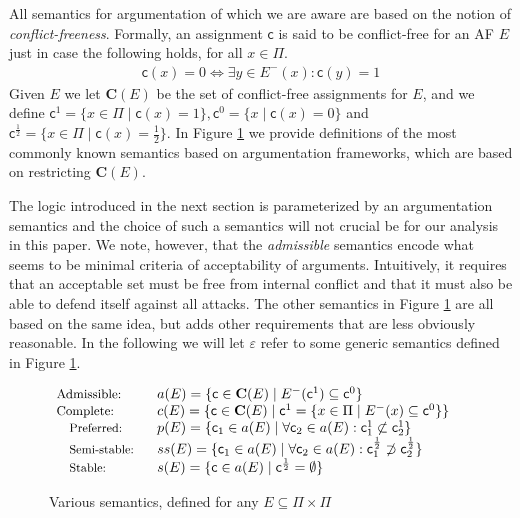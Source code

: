 \documentclass[greybox]{svmult}
\newcommand{\proto}{\mathbf C}
\newcommand{\clab}{\mathsf c}
\newcommand{\sem}{\varepsilon}
\begin{document}
All semantics for argumentation of which we are aware are based on the notion of \emph{conflict-freeness}. Formally, an assignment $\clab$ is said to be conflict-free for an AF $E$ just in case the following holds, for all $x \in \Pi$.
\begin{equation}\label{eq:cam}
\begin{array}{l}
\clab(x) = 0 \iff \exists y \in E^-(x): \clab(y) = 1
\end{array}
\end{equation}
Given $E$ we let $\proto(E)$ be the set of conflict-free assignments for $E$, and we define $\clab^1 = \{x \in \Pi \mid \clab(x) = 1\}, \clab^0 = \{x \mid \clab(x) = 0\}$ and $\clab^{\frac{1}{2}} = \{x \in \Pi \mid \clab(x) = \frac{1}{2}\}$. In Figure \ref{fig:sem} we provide definitions of the most commonly known semantics based on argumentation frameworks, which are based on restricting $\proto(E)$. 

The logic introduced in the next section is parameterized by an argumentation semantics and the choice of such a semantics will not crucial be for our analysis in this paper. We note, however, that the \emph{admissible} semantics encode what seems to be minimal criteria of acceptability of arguments. Intuitively, it requires that an acceptable set must be free from internal conflict and that it must also be able to defend itself against all attacks. The other semantics in Figure \ref{fig:sem} are all based on the same idea, but adds other requirements that are less obviously reasonable. In the following we will let $\sem$ refer to some generic semantics defined in Figure \ref{fig:sem}.

\begin{figure}
$\begin{array}{ll}
\text{\footnotesize{Admissible: }} & a(E) = \{\clab \in \proto(E) \mid  E^-(\clab^1) \subseteq \clab^0\} \\
\text{\footnotesize{Complete:}} & c(E) =  \{\clab \in \proto(E) \mid \clab^1 = \{x \in \Pi \mid E^-(x) \subseteq \clab^0\}\} \\
\text{\small{Preferred:}} \ \ & p(E) = \{\clab_1 \in a(E) \mid \forall \clab_2 \in a(E): \clab^1_1 \not \subset \clab^1_2\} \\
\text{\small{Semi-stable:}} \ \ & ss(E) = \{\clab_1 \in a(E) \mid \forall \clab_2 \in a(E): \clab^{\frac{1}{2}}_1 \not \supset \clab^{\frac{1}{2}}_2\} \\
\text{\small{Stable:}} \ \ & s(E) = \{\clab \in a(E) \mid \clab^{\frac{1}{2}} = \emptyset\} 
\end{array}$
\caption{Various semantics, defined for any $E \subseteq \Pi \times \Pi$}
\label{fig:sem}
\end{figure}
\end{document}
